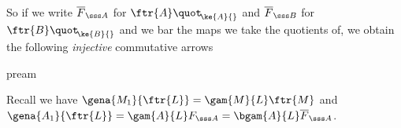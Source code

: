 \documentclass[a4paper,11pt,german,english]{article}
\begin{document}







\medskip
So if we write 
$\overline{F}_{\sss A}$ for $\ftr{A}\quot_{\!\ke{A}{}}$ and
$\overline{F}_{\sss B}$ for $\ftr{B}\quot_{\!\ke{B}{}}$ and we bar the maps
we take the quotients of,
we obtain the following
{\em injective} commutative arrows
\begin{labeq}{pream}
\end{labeq}
Recall we have $\gena{M_{1}}{\ftr{L}}=\gam{M}{L}\ftr{M}$ and $\gena{A_{1}}{\ftr{L}}=
\gam{A}{L}F_{\sss A}=\bgam{A}{L} \overline{F}_{\sss A}$.
\end{document}
